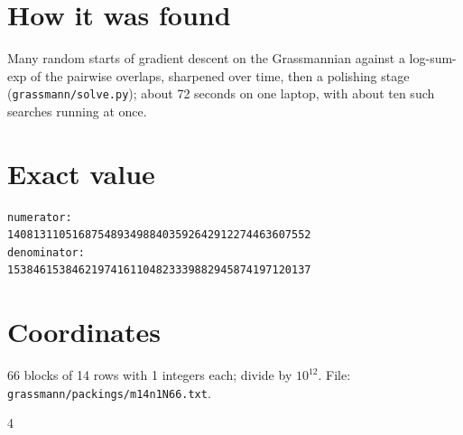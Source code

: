 \documentclass[11pt,a4paper]{article}
\begin{document}
\section{How it was found}
Many random starts of gradient descent on the Grassmannian against a log-sum-exp of the pairwise overlaps, sharpened over time, then a polishing stage (\texttt{grassmann/solve.py}); about 72 seconds on one laptop, with about ten such searches running at once.


\appendix
\section{Exact value}
{\small
\begin{verbatim}
numerator:
14081311051687548934988403592642912274463607552
denominator:
15384615384621974161104823339882945874197120137
\end{verbatim}}

\section{Coordinates}
66 blocks of 14 rows with 1 integers each; divide by $10^{12}$. File: \texttt{grassmann/packings/m14n1N66.txt}.
{\tiny
\begin{multicols}{4}
\end{multicols}}
\end{document}
